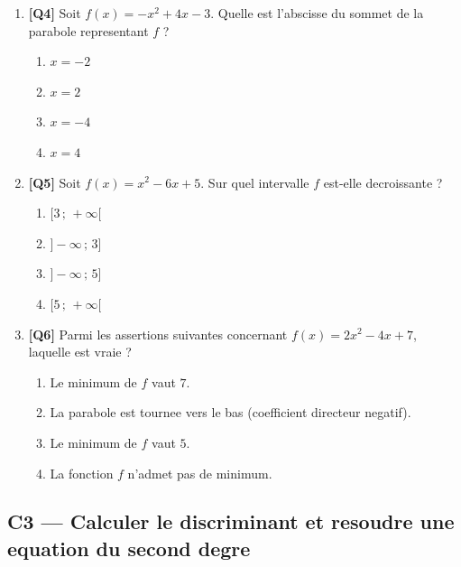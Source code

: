 \begin{enumerate}[resume]

\item \textbf{[Q4]} Soit $f(x) = -x^2 + 4x - 3$.
  Quelle est l'abscisse du sommet de la parabole representant $f$ ?

  \begin{enumerate}[label=\Alph*.]
    \item $x = -2$
    \item $x = 2$
    \item $x = -4$
    \item $x = 4$
  \end{enumerate}

\bigskip

\item \textbf{[Q5]} Soit $f(x) = x^2 - 6x + 5$.
  Sur quel intervalle $f$ est-elle decroissante ?

  \begin{enumerate}[label=\Alph*.]
    \item $[3\,;\,+\infty[$
    \item $]-\infty\,;\,3]$
    \item $]-\infty\,;\,5]$
    \item $[5\,;\,+\infty[$
  \end{enumerate}

\bigskip

\item \textbf{[Q6]} Parmi les assertions suivantes concernant $f(x) = 2x^2 - 4x + 7$,
  laquelle est vraie ?

  \begin{enumerate}[label=\Alph*.]
    \item Le minimum de $f$ vaut $7$.
    \item La parabole est tournee vers le bas (coefficient directeur negatif).
    \item Le minimum de $f$ vaut $5$.
    \item La fonction $f$ n'admet pas de minimum.
  \end{enumerate}

\end{enumerate}

\bigskip

\subsection*{C3 — Calculer le discriminant et resoudre une equation du second degre}

